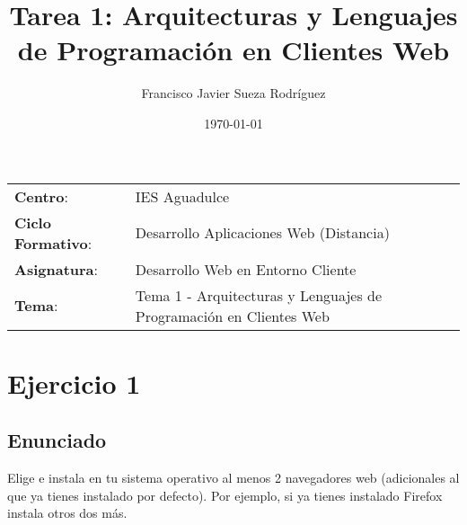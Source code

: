 


\title{
\vspace{10ex}
\normalfont \normalsize
\huge \textbf{Tarea 1: Arquitecturas y Lenguajes de Programación en Clientes Web}
}
\author{Francisco Javier Sueza Rodríguez}
\date{\normalsize\today}



\maketitle

\thispagestyle{empty}

\vspace{65ex}

\begin{center}
    \begin{tabular}{l l}
        \textbf{Centro}: & IES Aguadulce \\
        \textbf{Ciclo Formativo}: & Desarrollo Aplicaciones Web (Distancia)\\
        \textbf{Asignatura}: & Desarrollo Web en Entorno Cliente\\
        \textbf{Tema}: & Tema 1 -  Arquitecturas y Lenguajes de Programación en Clientes Web\\
    \end{tabular}
\end{center}

\newpage

\section{Ejercicio 1}

\subsection{Enunciado}
Elige  e instala en tu sistema operativo al menos 2 navegadores web (adicionales al que ya tienes instalado por defecto). Por ejemplo, si ya tienes instalado Firefox instala otros dos más.

